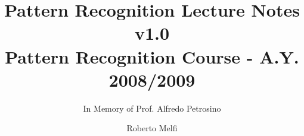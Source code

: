 \documentclass[envcountsame,envcountchap]{svmono}
\begin{document}
\author{Roberto Melfi}

\title{Pattern Recognition Lecture Notes {\small v1.0}\\
{\small Pattern Recognition Course - A.Y. 2008/2009}}
\subtitle{In Memory of Prof. Alfredo Petrosino}
\maketitle

\frontmatter%




\tableofcontents


\mainmatter%







%





\backmatter%
%

\printindex

\end{document}
